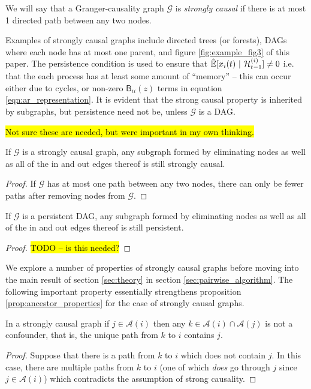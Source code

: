 \documentclass[12pt]{article}
\def\gcg{\mathcal{G}}  %
\def\B{\mathsf{B}}  %
\def\H{\mathcal{H}}  %
\newcommand{\linE}[2]{\hat{\E}[#1\ |\ #2]}  %
\newcommand{\anc}[1]{\mathcal{A}(#1)}  %
\begin{document}
\begin{definition}
  \label{def:strongly_causal}
  We will say that a Granger-causality graph $\gcg$ is
  \textit{strongly causal} if there is at most 1 directed path between
  any two nodes.
\end{definition}

Examples of strongly causal graphs include directed trees (or
forests), DAGs where each node has at most one parent, and figure
\ref{fig:example_fig3} of this paper.  The persistence condition is
used to ensure that $\linE{x_i(t)}{\H_{t - 1}^{(i)}} \ne 0$ i.e. that
the each process has at least some amount of ``memory'' -- this can
occur either due to cycles, or non-zero $\B_{ii}(z)$ terms in equation
\eqref{eqn:ar_representation}.  It is evident that the strong causal property
is inherited by subgraphs, but persistence need not be, unless $\gcg$ is a DAG.

\hl{Not sure these are needed, but were important in my own thinking.}

\begin{lemma}
  \label{lem:still_strongly_causal}
  If $\gcg$ is a strongly causal graph, any subgraph formed by eliminating nodes
  as well as all of the in and out edges thereof is still strongly causal.
\end{lemma}
\begin{proof}
  If $\gcg$ has at most one path between any two nodes, there can only
  be fewer paths after removing nodes from $\gcg$.
\end{proof}

\begin{lemma}
  \label{lem:still_persistent}
  If $\gcg$ is a persistent DAG, any subgraph formed by eliminating nodes
  as well as all of the in and out edges thereof is still persistent.
\end{lemma}
\begin{proof}
  \hl{TODO -- is this needed?}
\end{proof}

We explore a number of properties of strongly causal graphs before
moving into the main result of section \ref{sec:theory} in section
\ref{sec:pairwise_algorithm}.  The following important property
essentially strengthens proposition \ref{prop:ancestor_properties}
for the case of strongly causal graphs.

\begin{proposition}
  \label{prop:sc_graph_common_anc}
  In a strongly causal graph if $j \in \anc{i}$ then any
  $k \in \anc{i} \cap \anc{j}$ is not a confounder, that is,
  the unique path from $k$ to $i$ contains $j$.
\end{proposition}
\begin{proof}
  Suppose that there is a path from $k$ to $i$ which does not contain
  $j$.  In this case, there are multiple paths from $k$ to $i$ (one of
  which \textit{does} go through $j$ since $j \in \anc{i}$) which
  contradicts the assumption of strong causality.
\end{proof}
\end{document}
